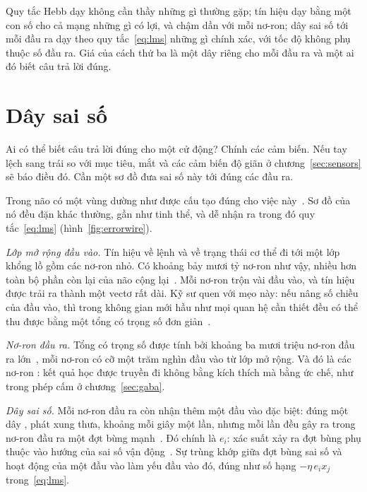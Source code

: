 \begin{keyblock}
\begin{proposition}
\label{prop:teachers}
Quy tắc Hebb dạy không cần thầy những gì thường gặp; tín hiệu  dạy bằng một con số cho cả mạng những gì có lợi, và chậm dần với mỗi nơ-ron; dây sai số tới mỗi đầu ra dạy theo quy tắc~\eqref{eq:lms} những gì chính xác, với tốc độ không phụ thuộc số đầu ra. Giá của cách thứ ba là một dây riêng cho mỗi đầu ra và một ai đó biết câu trả lời đúng.
\end{proposition}
\end{keyblock}

\section{Dây sai số}

Ai có thể biết câu trả lời đúng cho một cử động? Chính các cảm biến. Nếu tay lệch sang trái so với mục tiêu, mắt và các cảm biến độ giãn ở chương~\ref{sec:sensors} sẽ báo điều đó. Cần một sơ đồ đưa sai số này tới đúng các đầu ra.

Trong não có một vùng dường như được cấu tạo đúng cho việc này~\cite{Marr1969,Albus1971}. Sơ đồ của nó đều đặn khác thường, gần như tinh thể, và dễ nhận ra trong đó quy tắc~\eqref{eq:lms} (hình~\ref{fig:errorwire}).

\emph{Lớp mở rộng đầu vào.} Tín hiệu về lệnh và về trạng thái cơ thể đi tới một lớp khổng lồ gồm các nơ-ron  nhỏ. Có khoảng bảy mươi tỷ nơ-ron như vậy, nhiều hơn toàn bộ phần còn lại của não cộng lại~\cite{Azevedo2009}. Mỗi nơ-ron trộn vài đầu vào, và tín hiệu được trải ra thành một vectơ rất dài. Kỹ sư quen với mẹo này: nếu nâng số chiều của đầu vào, thì trong không gian mới hầu như mọi quan hệ cần thiết đều có thể thu được bằng một tổng có trọng số đơn giản~\cite{Cover1965}.

\emph{Nơ-ron đầu ra.} Tổng có trọng số được tính bởi khoảng ba mươi triệu nơ-ron đầu ra lớn~\cite{Andersen1992cereb}, mỗi nơ-ron có cỡ một trăm nghìn đầu vào từ lớp mở rộng. Và đó là các nơ-ron : kết quả học được truyền đi không bằng kích thích mà bằng ức chế, như trong phép cấm ở chương~\ref{sec:gaba}.

\emph{Dây sai số.} Mỗi nơ-ron đầu ra còn nhận thêm một đầu vào đặc biệt: đúng một dây , phát xung thưa, khoảng mỗi giây một lần, nhưng mỗi lần đều gây ra trong nơ-ron đầu ra một đợt bùng mạnh~\cite{Ito2001}. Đó chính là $e_i$: xác suất xảy ra đợt bùng phụ thuộc vào hướng của sai số vận động~\cite{Herzfeld2018}. Sự trùng khớp giữa đợt bùng sai số và hoạt động của một đầu vào làm yếu đầu vào đó, đúng như số hạng $-\eta\,e_i x_j$ trong~\eqref{eq:lms}.


